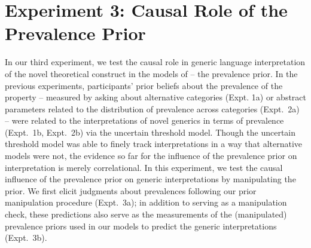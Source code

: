 \documentclass[floatsintext,man]{apa6}
\begin{document}






\hypertarget{experiment-3-prior-manipulation}{%
\section{Experiment 3: Causal Role of the Prevalence Prior}\label{experiment-3-prior-manipulation}}

In our third experiment, we test the causal role in generic language interpretation of the novel theoretical construct in the models of  -- the prevalence prior.
In the previous experiments, participants' prior beliefs about the prevalence of the property -- measured by asking about alternative categories (Expt. 1a) or abstract parameters related to the distribution of prevalence across categories (Expt.~2a) -- were related to the interpretations of novel generics in terms of prevalence (Expt.~1b, Expt.~2b) via the uncertain threshold model.
Though the uncertain threshold model was able to finely track interpretations in a way that alternative models were not, the evidence so far for the influence of the prevalence prior on interpretation is merely correlational.
In this experiment, we test the causal influence of the prevalence prior on generic interpretations by manipulating the prior.
We first elicit judgments about prevalences following our prior manipulation procedure (Expt.~3a); in addition to serving as a manipulation check, these predictions also serve as the measurements of the (manipulated) prevalence priors used in our models to predict the generic interpretations (Expt.~3b).
\end{document}
